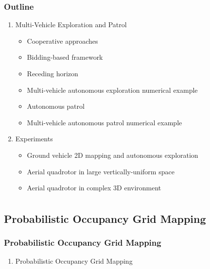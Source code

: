 \documentclass[11pt,professionalfonts,hyperref={pdftex,pdfpagemode=none,pdfstartview=FitH}]{beamer}
\begin{document}
\begin{frame}
\frametitle{Outline}
\begin{enumerate}[I]
\addtocounter{enumi}{2}
	\item Multi-Vehicle Exploration and Patrol
	\begin{itemize}
		\item Cooperative approaches
		\item Bidding-based framework
		\item Receding horizon
		\item Multi-vehicle autonomous exploration numerical example
		\item Autonomous patrol
		\item Multi-vehicle autonomous patrol numerical example
	\end{itemize}
	\pause
	\item Experiments
	\begin{itemize}
		\item Ground vehicle 2D mapping and autonomous exploration
		\item Aerial quadrotor in large vertically-uniform space
		\item Aerial quadrotor in complex 3D environment
	\end{itemize}
\end{enumerate}
\end{frame}


\section*{}
\subsection*{Probabilistic Occupancy Grid Mapping}

\begin{frame}
\frametitle{Probabilistic Occupancy Grid Mapping}
\begin{enumerate}[I]
	\item Probabilistic Occupancy Grid Mapping
\end{enumerate}
\end{frame}
	
\end{document}
